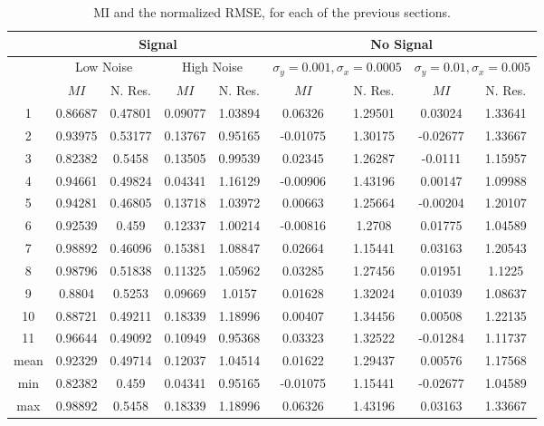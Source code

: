 \begin{table}[t]
\centering
\begin{tabular}{|c | c | c | c | c | c | c | c | c |}
\hline
& \multicolumn{4}{|c|}{Signal} & \multicolumn{4}{|c|}{No Signal}\\
\hline
& \multicolumn{2}{|c|}{Low Noise} & \multicolumn{2}{|c|}{High Noise}
& \multicolumn{2}{|c|}{$\sigma_y = 0.001, \sigma_x = 0.0005$}
& \multicolumn{2}{|c|}{$\sigma_y = 0.01, \sigma_x = 0.005$}\\
\hline
& $MI$ & N. Res. &
  $MI$ & N. Res. &
  $MI$ & N. Res. &
  $MI$ & N. Res. \\
\hline
\hline
1 &   0.86687  &0.47801 &  0.09077  &1.03894 &  0.06326  &  1.29501 & 0.03024  &1.33641 \\
2 &   0.93975  &0.53177 &  0.13767  &0.95165 &  -0.01075  & 1.30175 & -0.02677 &1.33667 \\
3 &   0.82382  &0.5458  &  0.13505  &0.99539 &  0.02345  &  1.26287 & -0.0111  &1.15957 \\
4 &   0.94661  &0.49824 &  0.04341  &1.16129 &  -0.00906  & 1.43196 & 0.00147  &1.09988 \\
5 &   0.94281  &0.46805 &  0.13718  &1.03972 &  0.00663  &  1.25664 & -0.00204 &1.20107 \\
6 &   0.92539  &0.459   &  0.12337  &1.00214 &  -0.00816  & 1.2708 &  0.01775  &1.04589 \\
7 &   0.98892  &0.46096 &  0.15381  &1.08847 &  0.02664  &  1.15441 & 0.03163  &1.20543 \\
8 &   0.98796  &0.51838 &  0.11325  &1.05962 &  0.03285  &  1.27456 & 0.01951  &1.1225 \\
9 &   0.8804   &0.5253  &  0.09669  &1.0157  &  0.01628  &  1.32024 & 0.01039  &1.08637 \\
10 &  0.88721   &0.49211 & 0.18339  &1.18996 &  0.00407  &  1.34456 & 0.00508  &1.22135 \\
11 &  0.96644   &0.49092 & 0.10949  &0.95368 &  0.03323  &  1.32522 & -0.01284 &1.11737 \\
\hline
mean &0.92329  &0.49714 & 0.12037   &1.04514 &  0.01622  &  1.29437 & 0.00576  &1.17568 \\
\hline
min &  0.82382  &0.459   &  0.04341  &0.95165 & -0.01075  & 1.15441 & -0.02677 &1.04589 \\
\hline
max &  0.98892  &0.5458  & 0.18339   &1.18996 & 0.06326  &  1.43196 & 0.03163  &1.33667 \\
\hline
\end{tabular}
\caption{\acs{MI} and the normalized \acs{RMSE}, for each of the previous sections.}
\label{tab:SingleVoxelActivationComparison}
\end{table}



